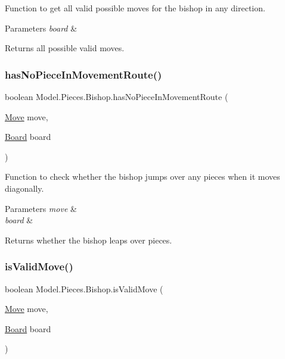 Function to get all valid possible moves for the bishop in any direction. 
\begin{DoxyParams}{Parameters}
{\em board} & \\
\hline
\end{DoxyParams}
\begin{DoxyReturn}{Returns}
all possible valid moves. 
\end{DoxyReturn}
\hypertarget{class_model_1_1_pieces_1_1_bishop_a5d2d653911307254ade5f9b25b4afaf7}{}\label{class_model_1_1_pieces_1_1_bishop_a5d2d653911307254ade5f9b25b4afaf7} 
\subsubsection{\texorpdfstring{has\+No\+Piece\+In\+Movement\+Route()}{hasNoPieceInMovementRoute()}}
{\footnotesize\ttfamily boolean Model.\+Pieces.\+Bishop.\+has\+No\+Piece\+In\+Movement\+Route (\begin{DoxyParamCaption}\item[{\hyperlink{class_model_1_1_move}{Move}}]{move,  }\item[{\hyperlink{class_model_1_1_board}{Board}}]{board }\end{DoxyParamCaption})}

Function to check whether the bishop jumps over any pieces when it moves diagonally. 
\begin{DoxyParams}{Parameters}
{\em move} & \\
\hline
{\em board} & \\
\hline
\end{DoxyParams}
\begin{DoxyReturn}{Returns}
whether the bishop leaps over pieces. 
\end{DoxyReturn}
\hypertarget{class_model_1_1_pieces_1_1_bishop_a7767730f9b26965b39385080947c0f6a}{}\label{class_model_1_1_pieces_1_1_bishop_a7767730f9b26965b39385080947c0f6a} 
\subsubsection{\texorpdfstring{is\+Valid\+Move()}{isValidMove()}}
{\footnotesize\ttfamily boolean Model.\+Pieces.\+Bishop.\+is\+Valid\+Move (\begin{DoxyParamCaption}\item[{\hyperlink{class_model_1_1_move}{Move}}]{move,  }\item[{\hyperlink{class_model_1_1_board}{Board}}]{board }\end{DoxyParamCaption})}

